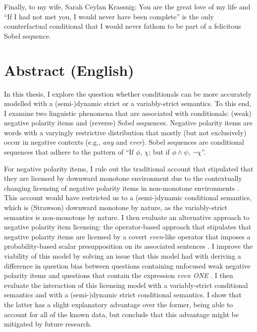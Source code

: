 Finally, to my wife, Sarah Ceylan Krassnig: You are the great love of my life and \enquote{If I had not met you, I would never have been complete} is the only counterfactual conditional that I would never fathom to be part of a felicitous Sobel sequence.
\cleardoublepage
\section*{Abstract (English)}%
In this thesis, I explore the question whether conditionals can be more accurately modelled with a \mbox{(semi-)}dynamic strict \parencite{Fintel2001,Gillies2007} or a variably-strict \parencite{Stalnaker1968,Lewis1973} semantics. To this end, I examine two linguistic phenomena that are associated with conditionals: (weak) negative polarity items and (reverse) Sobel sequences. Negative polarity items are words with a varyingly restrictive distribution that mostly (but not exclusively) occur in negative contexts (e.g., \textit{any} and \textit{ever}). Sobel sequences are conditional sequences that adhere to the pattern of \enquote{If $\phi$, $\chi$; but if $\phi\land\psi$, $\neg\chi$}. 

For negative polarity items, I rule out the traditional account that stipulated that they are licensed by downward monotone environment \parencite{Fauconnier1975a,Fauconnier1975b,Ladusaw1980} due to the contextually changing licensing of negative polarity items in non-monotone environments \parencite{Crnic2011}. This account would have restricted us to a (semi-)dynamic conditional semantics, which is (Strawson) downward monotone by nature, as the variably-strict semantics is non-monotone by nature. I then evaluate an alternative approach to negative polarity item licensing: the operator-based approach that stipulates that negative polarity items are licensed by a covert \textit{even}-like operator that imposes a probability-based scalar presupposition on its associated sentences \parencite[see, amongst others,][]{Crnic2014-dogma,Crnic2014-nm}. I improve the viability of this model by solving an issue that this model had with deriving a difference in question bias between questions containing unfocused weak negative polarity items and questions that contain the expression \textit{even \MakeUppercase{one}} \parencite[see, amongst others,][]{Crnic2014-dogma,Crnic2014-nm,Krassnig2018,Jeong2021,Jeong2022}. I then evaluate the interaction of this licensing model with a variably-strict conditional semantics and with a (semi-)dynamic strict conditional semantics. I show that the latter has a slight explanatory advantage over the former, being able to account for all of the known data, but conclude that this advantage might be mitigated by future research.

